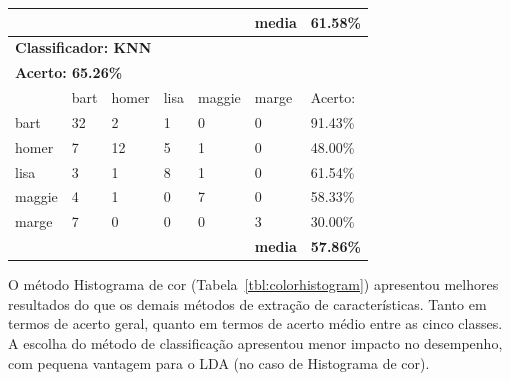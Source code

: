 \documentclass[journal]{IEEEtran}
\begin{document}
\begin{table}[!htb]
\begin{tabular}{l|l|l|l|l|l|l}
          &           &           &           &           & \textbf{media} & \textbf{61.58\%} \\ \hline
\multicolumn{7}{l}{\textbf{Classificador: KNN}}                                                \\ \hline
\multicolumn{7}{l}{\textbf{Acerto: 65.26\%}}                                                  \\ \hline
          & bart      & homer     & lisa      & maggie    & marge          & Acerto:            \\ \hline
bart      & 32        & 2         & 1         & 0         & 0              & 91.43\%          \\ \hline
homer     & 7         & 12        & 5         & 1         & 0              & 48.00\%          \\ \hline
lisa      & 3         & 1         & 8         & 1         & 0              & 61.54\%          \\ \hline
maggie    & 4         & 1         & 0         & 7         & 0              & 58.33\%          \\ \hline
marge     & 7         & 0         & 0         & 0         & 3              & 30.00\%          \\ \hline
          &           &           &           & \textbf{} & \textbf{media} & \textbf{57.86\%} \\ \hline
\end{tabular}
\end{table}

O método Histograma de cor (Tabela~\ref{tbl:colorhistogram}) apresentou melhores resultados do que os demais métodos de extração de características.
Tanto em termos de acerto geral, quanto em termos de acerto médio entre as cinco classes.
A escolha do método de classificação apresentou menor impacto no desempenho, com pequena vantagem para o LDA (no caso de Histograma de cor).
\end{document}
